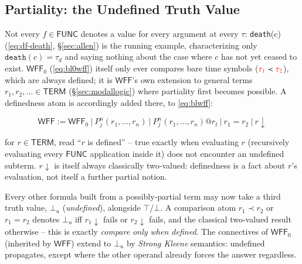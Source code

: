 \subsection{Partiality: the Undefined Truth Value}\label{sec:bldefinedness}

\pn Not every $f\in\mathsf{FUNC}$ denotes a value for every argument at every $\tau$: \texttt{death}(c) (\ref{eq:df-death}, \S\ref{sec:allen}) is the running example, characterizing only $\texttt{death}(c)=\tau_d$ and saying nothing about the case where $c$ has not yet ceased to exist. $\mathsf{WFF}_0$ (\eqref{eq:bl0wff}) itself only ever compares bare time symbols ($\msc{\tau_1}\prec\msc{\tau_2}$), which are always defined; it is $\mathsf{WFF}$'s own extension to general terms $r_1,r_2,\ldots\in\mathsf{TERM}$ (\S\ref{sec:modallogic}) where partiality first becomes possible. A definedness atom is accordingly added there, to \eqref{eq:blwff}:

\[ \mathsf{WFF}:= \mathsf{WFF}_0~\vert~ P^n_j(r_1,\ldots,r_n)~\vert~ P^n_j(r_1,\ldots,r_n)@r_t~\vert~ r_1=r_2~\vert~r\!\downarrow \]

for $r \in \mathsf{TERM}$, read ``$r$ is defined'' -- true exactly when evaluating $r$ (recursively evaluating every $\mathsf{FUNC}$ application inside it) does not encounter an undefined subterm. $r\!\downarrow$ is itself always classically two-valued: definedness is a fact about $r$'s evaluation, not itself a further partial notion.

\pn Every other formula built from a possibly-partial term may now take a third truth value, $\bot_u$ (\emph{undefined}), alongside $\top$/$\bot$. A comparison atom $r_1 \prec r_2$ or $r_1 = r_2$ denotes $\bot_u$ iff $r_1\!\downarrow$ fails or $r_2\!\downarrow$ fails, and the classical two-valued result otherwise -- this is exactly \emph{compare only when defined}. The connectives of $\mathsf{WFF}_0$ (inherited by $\mathsf{WFF}$) extend to $\bot_u$ by \emph{Strong Kleene} semantics: undefined propagates, except where the other operand already forces the answer regardless.


